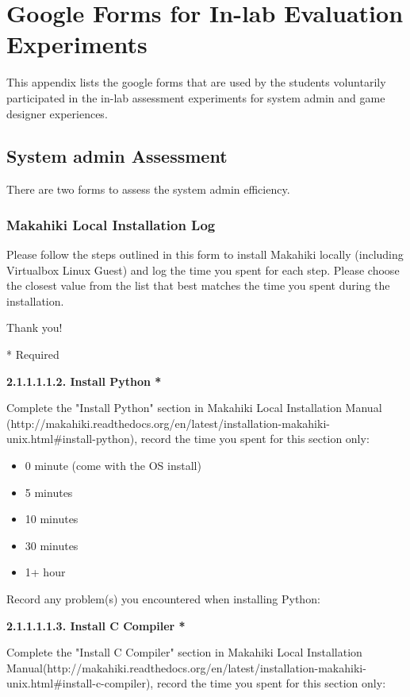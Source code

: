 \chapter{Google Forms for In-lab Evaluation Experiments}
\label{app:googleform}

This appendix lists the google forms that are used by the students voluntarily participated in the in-lab assessment experiments for system admin and game designer experiences.

\section{System admin Assessment}
There are two forms to assess the system admin efficiency.

\subsection{Makahiki Local Installation Log}

\setlength{\parindent}{0pt}
\setlength{\parskip}{3mm}

Please follow the steps outlined in this form to install Makahiki locally (including Virtualbox Linux Guest) and log the time you spent for each step.
Please choose the closest value from the list that best matches the time you spent during the installation.

Thank you!

* Required

{\bf 2.1.1.1.1.2. Install Python *}

Complete the "Install Python" section in Makahiki Local Installation Manual (http://makahiki.readthedocs.org/en/latest/installation-makahiki-unix.html\#install-python), record the time you spent for this section only:

\begin{itemize}
\item 0 minute (come with the OS install)
\item 5 minutes
\item  10 minutes
\item  30 minutes
\item  1+ hour
\end{itemize}


Record any problem(s) you encountered when installing Python:

{\bf 2.1.1.1.1.3. Install C Compiler *}

Complete the "Install C Compiler" section in Makahiki Local Installation Manual(http://makahiki.readthedocs.org/en/latest/installation-makahiki-unix.html\#install-c-compiler), record the time you spent for this section only:

